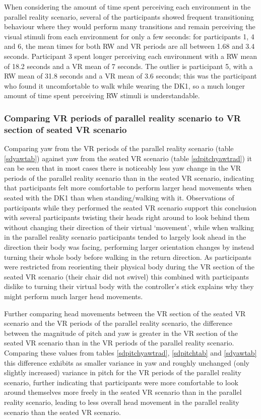 When considering the amount of time spent perceiving each environment in the parallel reality scenario, several of the participants showed frequent transitioning behaviour where they would perform many transitions and remain perceiving the visual stimuli from each environment for only a few seconds: for participants 1, 4 and 6, the mean times for both RW and VR periods are all between 1.68 and 3.4 seconds. Participant 3 spent longer perceiving each environment with a RW mean of 18.2 seconds and a VR mean of 7 seconds. The outlier is participant 5, with a RW mean of 31.8 seconds and a VR mean of 3.6 seconds; this was the participant who found it uncomfortable to walk while wearing the DK1, so a much longer amount of time spent perceiving RW stimuli is understandable.

\subsubsection{Comparing VR periods of parallel reality scenario to VR section of seated VR scenario}

Comparing yaw from the VR periods of the parallel reality scenario (table \ref{sdyawtab}) against yaw from the seated VR scenario (table \ref{sdpitchyawtrad}) it can be seen that in most cases there is noticeably less yaw change in the VR periods of the parallel reality scenario than in the seated VR scenario, indicating that participants felt more comfortable to perform larger head movements when seated with the DK1 than when standing/walking with it. Observations of participants while they performed the seated VR scenario support this conclusion with several participants twisting their heads right around to look behind them without changing their direction of their virtual `movement', while when walking in the parallel reality scenario participants tended to largely look ahead in the direction their body was facing, performing larger orientation changes by instead turning their whole body before walking in the return direction. As participants were restricted from reorienting their physical body during the VR section of the seated VR scenario (their chair did not swivel) this combined with participants dislike to turning their virtual body with the controller's stick explains why they might perform much larger head movements.

Further comparing head movements between the VR section of the seated VR scenario and the VR periods of the parallel reality scenario, the difference between the magnitude of pitch and yaw is greater in the VR section of the seated VR scenario than in the VR periods of the parallel reality scenario. Comparing these values from tables \ref{sdpitchyawtrad}, \ref{sdpitchtab} and \ref{sdyawtab} this difference exhibits as smaller variance in yaw and roughly unchanged (only slightly increased) variance in pitch for the VR periods of the parallel reality scenario, further indicating that participants were more comfortable to look around themselves more freely in the seated VR scenario than in the parallel reality scenario, leading to less overall head movement in the parallel reality scenario than the seated VR scenario.

